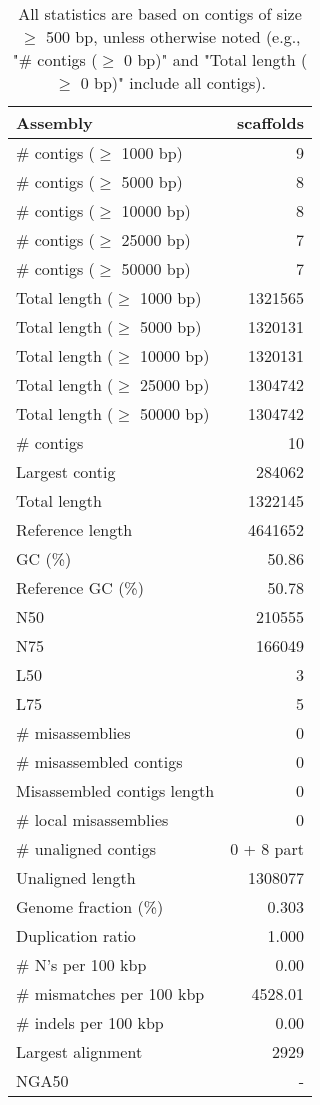 \documentclass[12pt,a4paper]{article}
\begin{document}
\begin{table}[ht]
\begin{center}
\caption{All statistics are based on contigs of size $\geq$ 500 bp, unless otherwise noted (e.g., "\# contigs ($\geq$ 0 bp)" and "Total length ($\geq$ 0 bp)" include all contigs).}
\begin{tabular}{|l*{1}{|r}|}
\hline
Assembly & scaffolds \\ \hline
\# contigs ($\geq$ 1000 bp) & 9 \\ \hline
\# contigs ($\geq$ 5000 bp) & 8 \\ \hline
\# contigs ($\geq$ 10000 bp) & 8 \\ \hline
\# contigs ($\geq$ 25000 bp) & 7 \\ \hline
\# contigs ($\geq$ 50000 bp) & 7 \\ \hline
Total length ($\geq$ 1000 bp) & 1321565 \\ \hline
Total length ($\geq$ 5000 bp) & 1320131 \\ \hline
Total length ($\geq$ 10000 bp) & 1320131 \\ \hline
Total length ($\geq$ 25000 bp) & 1304742 \\ \hline
Total length ($\geq$ 50000 bp) & 1304742 \\ \hline
\# contigs & 10 \\ \hline
Largest contig & 284062 \\ \hline
Total length & 1322145 \\ \hline
Reference length & 4641652 \\ \hline
GC (\%) & 50.86 \\ \hline
Reference GC (\%) & 50.78 \\ \hline
N50 & 210555 \\ \hline
N75 & 166049 \\ \hline
L50 & 3 \\ \hline
L75 & 5 \\ \hline
\# misassemblies & 0 \\ \hline
\# misassembled contigs & 0 \\ \hline
Misassembled contigs length & 0 \\ \hline
\# local misassemblies & 0 \\ \hline
\# unaligned contigs & 0 + 8 part \\ \hline
Unaligned length & 1308077 \\ \hline
Genome fraction (\%) & 0.303 \\ \hline
Duplication ratio & 1.000 \\ \hline
\# N's per 100 kbp & 0.00 \\ \hline
\# mismatches per 100 kbp & 4528.01 \\ \hline
\# indels per 100 kbp & 0.00 \\ \hline
Largest alignment & 2929 \\ \hline
NGA50 & - \\ \hline
\end{tabular}
\end{center}
\end{table}
\end{document}
